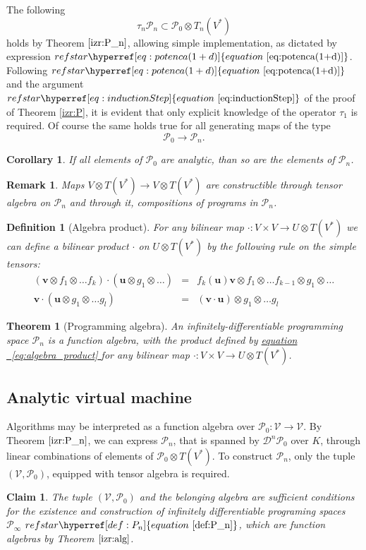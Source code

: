 \documentclass{article}
\makeatletter
\newcommand{\VV}{\mathcal{V}}
\newcommand{\uu}{\mathbf{u}}
\newcommand{\vv}{\mathbf{v}}
\newcommand{\dP}{\mathcal{P}}
\newcommand{\DD}{\mathcal{D}}
\newcommand{\sumd}{\tau}
\newtheorem{definicija}{Definition}[section]
\newtheorem{trditev}{Claim}[section]
\newtheorem{izrek}{Theorem}[section]
\newtheorem{opomba}{Remark}[section]
\newtheorem{corollary}{Corollary}[section]
\let\originaleqref\eqref %
\renewcommand{\eqref}[1]{%
  \begingroup%
  \let\ref\@refstar%
  \hyperref[#1]{%
    equation%
    ~\originaleqref{#1}%
  }%
  \endgroup
}
\makeatother
\begin{document}
    The following
     \begin{equation}
     	\sumd_n\dP_n\subset\dP_0\otimes T_n(V^*)
     \end{equation}
   	holds by Theorem $\ref{izr:P_n}$, allowing simple implementation, as dictated by expression $\eqref{eq:potenca(1+d)}$. Following $\eqref{eq:potenca(1+d)}$ and the argument $\eqref{eq:inductionStep}$ of the proof of Theorem \ref{izr:P}, it is evident that only explicit knowledge of the operator $\sumd_1$ is required.
        Of course the same holds true for all generating maps of the type
        $$\dP_0\to\dP_n.$$
 \begin{corollary}
   If all elements of $\dP_0$ are analytic, than so are the elements of $\dP_n$.
   \end{corollary}        
        
       \begin{opomba}\label{rem:vTen}
       Maps $V\otimes T(V^*)\to V\otimes T(V^*)$ are constructible through tensor algebra on $\dP_n$ and through it, compositions of programs in $\dP_n$.
       \end{opomba}
       
 

\begin{definicija}[Algebra product]
 For any bilinear map $\cdot :V\times V\to U\otimes T(V^*)$ we can define a
 bilinear product $\cdot$ on $U\otimes T(V^*)$ by the following rule on the simple
 tensors:
 \begin{eqnarray}
   \label{eq:algebra_product}
   (\vv\otimes f_1\otimes\ldots f_k) \cdot (\uu\otimes g_1\otimes\ldots) &=& 
f_k(\uu)\vv\otimes f_1\otimes\ldots f_{k-1}\otimes g_1\otimes\ldots \\
   \vv\cdot (\uu\otimes g_1\otimes\ldots g_l) &=&  (\vv\cdot \uu)\otimes
    \nonumber                                              g_1\otimes\ldots g_l
 \end{eqnarray}
\end{definicija}
\begin{izrek}[Programming algebra]\label{izr:alg}
An infinitely-differentiable programming space $\dP_n$ is a function algebra,
with the product defined by \eqref{eq:algebra_product} for any bilinear map $\cdot :V\times V\to U\otimes T(V^*)$.
\end{izrek}

\subsection{Analytic virtual machine}
Algorithms may be interpreted as a function algebra over $\dP_0:\VV\to \VV$.
By Theorem $\ref{izr:P_n}$, we can express $\dP_n$, that is spanned by $\DD^n\dP_0$ over $K$, through linear combinations of elements of $\dP_0\otimes T(V^*)$. To construct $\dP_n$, only the tuple $(\VV,\dP_0)$, equipped with tensor algebra is required.
\begin{trditev}
The tuple  $(\VV,\dP_0)$ and the belonging algebra are sufficient conditions for the existence and construction of infinitely differentiable programing spaces $\dP_\infty$ $\eqref{def:P_n}$, which are function algebras by Theorem $\ref{izr:alg}$.
\end{trditev}
\end{document}
